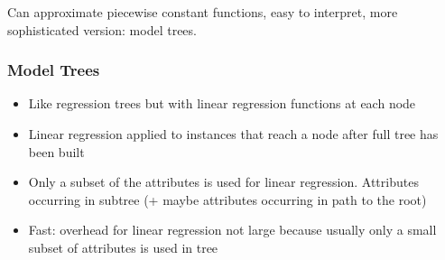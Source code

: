 Can approximate piecewise constant functions, easy to interpret, more sophisticated version: model trees.


\subsubsection{Model Trees}
\begin{itemize}
    \item Like regression trees but with linear regression functions at each node
    \item Linear regression applied to instances that reach a node after full tree has been built
    \item Only a subset of the attributes is used for linear regression. Attributes occurring in subtree (+ maybe attributes occurring in path to the root)
    \item Fast: overhead for linear regression not large because usually only a small subset of attributes is used in tree
\end{itemize}